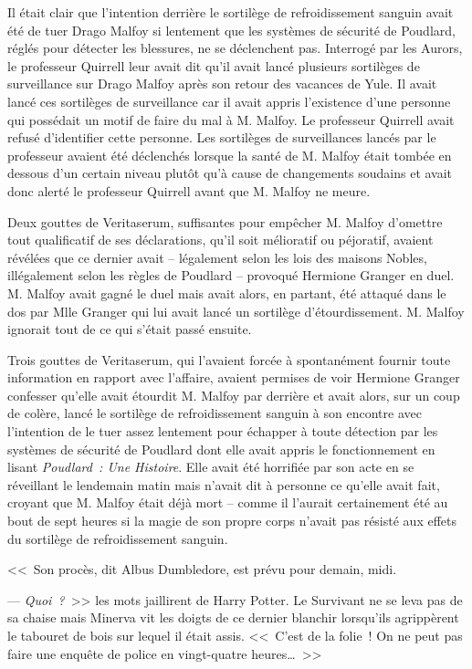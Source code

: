 Il était clair que l'intention derrière le sortilège de refroidissement sanguin avait été de tuer Drago Malfoy si lentement que les systèmes de sécurité de Poudlard, réglés pour détecter les blessures, ne se déclenchent pas. Interrogé par les Aurors, le professeur Quirrell leur avait dit qu'il avait lancé plusieurs sortilèges de surveillance sur Drago Malfoy après son retour des vacances de Yule. Il avait lancé ces sortilèges de surveillance car il avait appris l'existence d'une personne qui possédait un motif de faire du mal à M. Malfoy. Le professeur Quirrell avait refusé d'identifier cette personne. Les sortilèges de surveillances lancés par le professeur avaient été déclenchés lorsque la santé de M. Malfoy était tombée en dessous d'un certain niveau plutôt qu'à cause de changements soudains et avait donc alerté le professeur Quirrell avant que M. Malfoy ne meure.

Deux gouttes de Veritaserum, suffisantes pour empêcher M. Malfoy d'omettre tout qualificatif de ses déclarations, qu'il soit mélioratif ou péjoratif, avaient révélées que ce dernier avait -- légalement selon les lois des maisons Nobles, illégalement selon les règles de Poudlard -- provoqué Hermione Granger en duel. M. Malfoy avait gagné le duel mais avait alors, en partant, été attaqué dans le dos par Mlle Granger qui lui avait lancé un sortilège d'étourdissement. M. Malfoy ignorait tout de ce qui s'était passé ensuite.

Trois gouttes de Veritaserum, qui l'avaient forcée à spontanément fournir toute information en rapport avec l'affaire, avaient permises de voir Hermione Granger confesser qu'elle avait étourdit M. Malfoy par derrière et avait alors, sur un coup de colère, lancé le sortilège de refroidissement sanguin à son encontre avec l'intention de le tuer assez lentement pour échapper à toute détection par les systèmes de sécurité de Poudlard dont elle avait appris le fonctionnement en lisant \emph{Poudlard~: Une Histoire}. Elle avait été horrifiée par son acte en se réveillant le lendemain matin mais n'avait dit à personne ce qu'elle avait fait, croyant que M. Malfoy était déjà mort -- comme il l'aurait certainement été au bout de sept heures si la magie de son propre corps n'avait pas résisté aux effets du sortilège de refroidissement sanguin.

<<~Son procès, dit Albus Dumbledore, est prévu pour demain, midi.

--- \emph{Quoi~?}~>> les mots jaillirent de Harry Potter. Le Survivant ne se leva pas de sa chaise mais Minerva vit les doigts de ce dernier blanchir lorsqu'ils agrippèrent le tabouret de bois sur lequel il était assis. <<~C'est de la folie~! On ne peut pas faire une enquête de police en vingt-quatre heures…~>>

